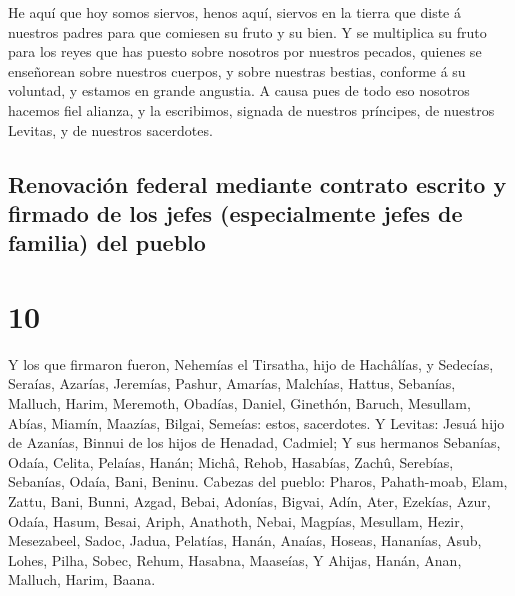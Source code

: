  He aquí que hoy somos siervos, henos aquí, siervos en la
tierra que diste á nuestros padres para que comiesen su fruto y su bien.
 Y se multiplica su fruto para los reyes que has puesto
sobre nosotros por nuestros pecados, quienes se enseñorean sobre
nuestros cuerpos, y sobre nuestras bestias, conforme á su voluntad, y
estamos en grande angustia.  A causa pues de todo eso
nosotros hacemos fiel alianza, y la escribimos, signada de nuestros
príncipes, de nuestros Levitas, y de nuestros sacerdotes.

\hypertarget{renovaciuxf3n-federal-mediante-contrato-escrito-y-firmado-de-los-jefes-especialmente-jefes-de-familia-del-pueblo}{%
\subsection{Renovación federal mediante contrato escrito y firmado de
los jefes (especialmente jefes de familia) del
pueblo}\label{renovaciuxf3n-federal-mediante-contrato-escrito-y-firmado-de-los-jefes-especialmente-jefes-de-familia-del-pueblo}}

\hypertarget{section-9}{%
\section{10}\label{section-9}}

 Y los que firmaron fueron, Nehemías el Tirsatha, hijo de
Hachâlías, y Sedecías,  Seraías, Azarías, Jeremías,
 Pashur, Amarías, Malchías,  Hattus,
Sebanías, Malluch,  Harim, Meremoth, Obadías,
 Daniel, Ginethón, Baruch,  Mesullam, Abías,
Miamín,  Maazías, Bilgai, Semeías: estos, sacerdotes.
 Y Levitas: Jesuá hijo de Azanías, Binnui de los hijos de
Henadad, Cadmiel;  Y sus hermanos Sebanías, Odaía,
Celita, Pelaías, Hanán;  Michâ, Rehob, Hasabías,
 Zachû, Serebías, Sebanías,  Odaía, Bani,
Beninu.  Cabezas del pueblo: Pharos, Pahath-moab, Elam,
Zattu, Bani,  Bunni, Azgad, Bebai, 
Adonías, Bigvai, Adín,  Ater, Ezekías, Azur,
 Odaía, Hasum, Besai,  Ariph, Anathoth,
Nebai,  Magpías, Mesullam, Hezir, 
Mesezabeel, Sadoc, Jadua,  Pelatías, Hanán, Anaías,
 Hoseas, Hananías, Asub,  Lohes, Pilha,
Sobec,  Rehum, Hasabna, Maaseías,  Y
Ahijas, Hanán, Anan,  Malluch, Harim, Baana.

